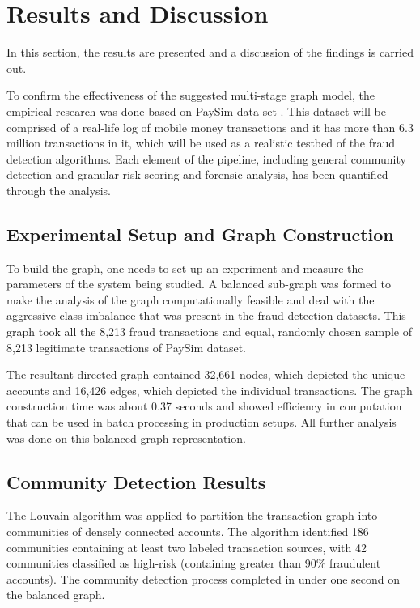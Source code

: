 \documentclass[lettersize,journal]{IEEEtran}
\begin{document}
\section{Results and Discussion}

In this section, the results are presented and a discussion of the findings is carried out.

To confirm the effectiveness of the suggested multi-stage graph model, the empirical research was done based on PaySim data set \cite{paysim2016}. This dataset will be comprised of a real-life log of mobile money transactions and it has more than 6.3 million transactions in it, which will be used as a realistic testbed of the fraud detection algorithms. Each element of the pipeline, including general community detection and granular risk scoring and forensic analysis, has been quantified through the analysis.

\subsection{Experimental Setup and Graph Construction}
To build the graph, one needs to set up an experiment and measure the parameters of the system being studied. A balanced sub-graph was formed to make the analysis of the graph computationally feasible and deal with the aggressive class imbalance that was present in the fraud detection datasets. This graph took all the 8,213 fraud transactions and equal, randomly chosen sample of 8,213 legitimate transactions of PaySim dataset.

The resultant directed graph contained 32,661 nodes, which depicted the unique accounts and 16,426 edges, which depicted the individual transactions. The graph construction time was about 0.37 seconds and showed efficiency in computation that can be used in batch processing in production setups. All further analysis was done on this balanced graph representation.

\subsection{Community Detection Results}
The Louvain algorithm was applied to partition the transaction graph into communities of densely connected accounts. The algorithm identified 186 communities containing at least two labeled transaction sources, with 42 communities classified as high-risk (containing greater than 90\% fraudulent accounts). The community detection process completed in under one second on the balanced graph.
\end{document}
